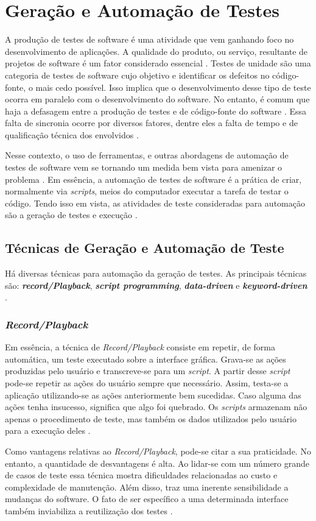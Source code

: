 \section{Geração e Automação de Testes}
A produção de testes de software é uma atividade que vem ganhando foco no desenvolvimento de aplicações. A qualidade do produto, ou serviço, resultante de projetos de software é um fator considerado essencial \cite{barbosaEtAl2009}. Testes de unidade são uma categoria de testes de software cujo objetivo e identificar os defeitos no código-fonte, o mais cedo possível. Isso implica que o desenvolvimento desse tipo de teste ocorra em paralelo com o desenvolvimento do software. No entanto, é comum que haja a defasagem entre a produção de testes e de código-fonte do software \cite{fantinatoEtAl2004}. Essa falta de sincronia ocorre por diversos fatores, dentre eles a falta de tempo e de qualificação técnica dos envolvidos \cite{fantinatoEtAl2004}.
\par
\indent Nesse contexto, o uso de ferramentas, e outras abordagens de automação de testes de software vem se tornando um medida bem vista para amenizar o problema \cite{fantinatoEtAl2004}. Em essência, a automação de testes de software é a prática de criar, normalmente via \textit{scripts}, meios do computador executar a tarefa de testar o código. Tendo isso em vista, as atividades de teste consideradas para automação são a geração de testes e execução \cite{fantinatoEtAl2004}.

\subsection{Técnicas de Geração e Automação de Teste}
Há diversas técnicas para automação da geração de testes. As principais técnicas são: \textbf{\textit{record/Playback}}, \textbf{\textit{script programming}}, \textbf{\textit{data-driven}} e \textbf{\textit{keyword-driven}} \cite{fantinatoEtAl2004}.
\subsubsection{\textit{Record/Playback}}
Em essência, a técnica de \textit{Record/Playback} consiste em repetir, de forma automática, um teste executado sobre a interface gráfica. Grava-se as ações produzidas pelo usuário e transcreve-se para um \textit{script}. A partir desse \textit{script} pode-se repetir as ações do usuário sempre que necessário. Assim, testa-se a aplicação utilizando-se as ações anteriormente bem sucedidas. Caso alguma das ações tenha insucesso, significa que algo foi quebrado. Os \textit{scripts} armazenam não apenas o procedimento de teste, mas também os dados utilizados pelo usuário para a execução deles \cite{kent2007}.
\par
\indent Como vantagens relativas ao \textit{Record/Playback}, pode-se citar a sua praticidade. No entanto, a quantidade de desvantagens é alta. Ao lidar-se com um número grande de casos de teste essa técnica mostra dificuldades relacionadas ao custo e complexidade de manutenção. Além disso, traz uma inerente sensibilidade a mudanças do software. O fato de ser específico a uma determinada interface também inviabiliza a reutilização dos testes \cite{fantinatoEtAl2004}.
